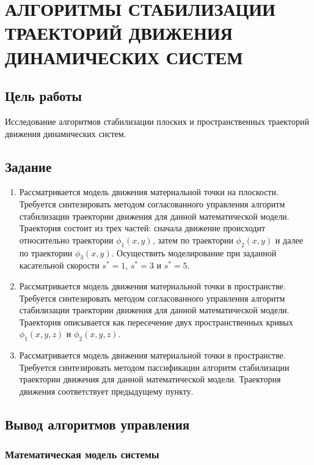 \chapter{АЛГОРИТМЫ СТАБИЛИЗАЦИИ ТРАЕКТОРИЙ ДВИЖЕНИЯ ДИНАМИЧЕСКИХ СИСТЕМ}

\section{Цель работы}

Исследование алгоритмов стабилизации плоских и пространственных траекторий движения динамических систем.

\section{Задание}

\begin{enumerate}
\item Рассматривается модель движения материальной точки на плоскости. Требуется синтезировать методом согласованного управления алгоритм стабилизации траектории движения для данной математической модели. Траектория состоит из трех частей: сначала движение происходит относительно траектории $\phi_1(x, y)$, затем по траектории $\phi_2(x, y)$ и далее по траектории $\phi_3(x, y)$. Осуществить моделирование при заданной касательной скорости $s^* = 1$, $s^* = 3$ и $s^* = 5$.

\item Рассматривается модель движения материальной точки в пространстве. Требуется синтезировать методом согласованного управления алгоритм стабилизации траектории движения для данной математической модели. Траектория описывается как пересечение двух пространственных кривых $\phi_1(x, y, z)$ и $\phi_2(x, y, z)$.

\item Рассматривается модель движения материальной точки в пространстве. Требуется синтезировать методом пассификации алгоритм стабилизации траектории движения для данной математической модели. Траектория движения соответствует предыдущему пункту.
\end{enumerate}

\section{Вывод алгоритмов управления}

\subsection{Математическая модель системы}


